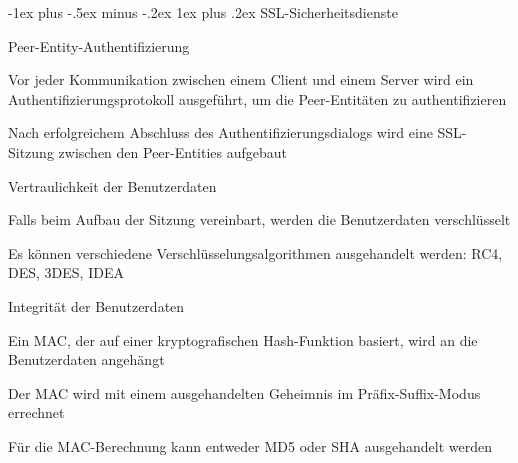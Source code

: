 \documentclass[a4paper]{article}
\makeatletter
\renewcommand{\subsubsection}{\@startsection{subsubsection}{3}{0mm}%
 {-1ex plus -.5ex minus -.2ex}%
 {1ex plus .2ex}%
 {\normalfont\small\bfseries}}
\makeatother
\begin{document}
\begin{multicols}{3}
      \subsubsection{SSL-Sicherheitsdienste}
      \begin{itemize*}
            \item Peer-Entity-Authentifizierung
            \begin{itemize*}
                  \item Vor jeder Kommunikation zwischen einem Client und einem Server wird ein Authentifizierungsprotokoll ausgeführt, um die Peer-Entitäten zu authentifizieren
                  \item Nach erfolgreichem Abschluss des Authentifizierungsdialogs wird eine SSL-Sitzung zwischen den Peer-Entities aufgebaut
            \end{itemize*}
            \item Vertraulichkeit der Benutzerdaten
            \begin{itemize*}
                  \item Falls beim Aufbau der Sitzung vereinbart, werden die Benutzerdaten verschlüsselt
                  \item Es können verschiedene Verschlüsselungsalgorithmen ausgehandelt werden: RC4, DES, 3DES, IDEA
            \end{itemize*}
            \item Integrität der Benutzerdaten
            \begin{itemize*}
                  \item Ein MAC, der auf einer kryptografischen Hash-Funktion basiert, wird an die Benutzerdaten angehängt
                  \item Der MAC wird mit einem ausgehandelten Geheimnis im Präfix-Suffix-Modus errechnet
                  \item Für die MAC-Berechnung kann entweder MD5 oder SHA ausgehandelt werden
            \end{itemize*}
      \end{itemize*}


\end{multicols}
\end{document}
